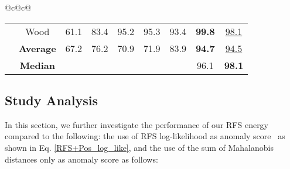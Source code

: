 \documentclass[journal]{IEEEtran}
\begin{document}
\begin{table*}[!h]
\begin{tabular}{@{}c@{}c@{}}
\begin{tabular}{ccccccccc}
		\rotatebox[origin=c]{90}{\parbox[c]{0cm}{Textures}}& Wood       & 61.1 & 83.4 & 95.2 & 95.3 & 93.4 & \textbf{99.8} &\underline{98.1}\\
		\cline{2-9}& \textbf{Average} & 67.2 & 76.2 & 70.9 & 71.9 & 83.9 &\textbf{94.7} &\underline{94.5}\\
		& \textbf{Median} &  &  &  &  &  &96.1 &\textbf{98.1}\\
		    \toprule
		
	\end{tabular}
\end{tabular}
\end{table*}	

\subsection{Study Analysis}
In this section, we further investigate the performance of our RFS energy compared to the following: the use of RFS log-likelihood as anomaly score~\cite{Vo2018} as shown in Eq. \eqref{RFS+Pos_log_like}, and the use of the sum of Mahalanobis distances only as anomaly score as follows:
\end{document}

